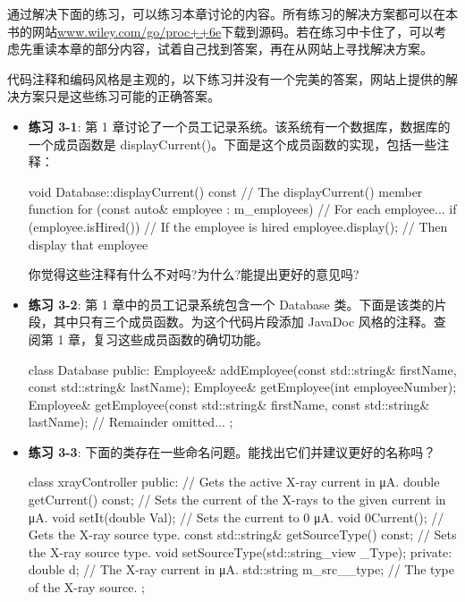 通过解决下面的练习，可以练习本章讨论的内容。所有练习的解决方案都可以在本书的网站\url{www.wiley.com/go/proc++6e}下载到源码。若在练习中卡住了，可以考虑先重读本章的部分内容，试着自己找到答案，再在从网站上寻找解决方案。

代码注释和编码风格是主观的，以下练习并没有一个完美的答案，网站上提供的解决方案只是这些练习可能的正确答案。

\begin{itemize}
\item
\textbf{练习 3-1}: 第 1 章讨论了一个员工记录系统。该系统有一个数据库，数据库的一个成员函数是 displayCurrent()。下面是这个成员函数的实现，包括一些注释：


\begin{cpp}
void Database::displayCurrent() const // The displayCurrent() member function
{
    for (const auto& employee : m_employees) { // For each employee...
        if (employee.isHired()) { // If the employee is hired
            employee.display(); // Then display that employee
        }
    }
}
\end{cpp}

你觉得这些注释有什么不对吗?为什么?能提出更好的意见吗?


\item
\textbf{练习 3-2}: 第 1 章中的员工记录系统包含一个 Database 类。下面是该类的片段，其中只有三个成员函数。为这个代码片段添加 JavaDoc 风格的注释。查阅第 1 章，复习这些成员函数的确切功能。

\begin{cpp}
class Database
{
    public:
    Employee& addEmployee(const std::string& firstName,
    const std::string& lastName);
    Employee& getEmployee(int employeeNumber);
    Employee& getEmployee(const std::string& firstName,
    const std::string& lastName);
    // Remainder omitted...
};
\end{cpp}

\item
\textbf{练习 3-3}: 下面的类存在一些命名问题。能找出它们并建议更好的名称吗？

\begin{cpp}
class xrayController
{
    public:
        // Gets the active X-ray current in μA.
        double getCurrent() const;
        // Sets the current of the X-rays to the given current in μA.
        void setIt(double Val);
        // Sets the current to 0 μA.
        void 0Current();
        // Gets the X-ray source type.
        const std::string& getSourceType() const;
        // Sets the X-ray source type.
        void setSourceType(std::string_view _Type);
    private:
        double d; // The X-ray current in μA.
        std::string m_src__type; // The type of the X-ray source.
};
\end{cpp}


\end{itemize}
